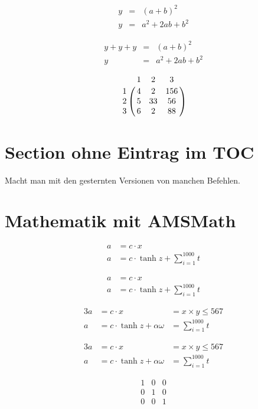 \documentclass[parskip=half]{scrartcl}
\begin{document}
\begin{eqnarray*} %
y &=& (a + b)^2 \\
y &=& a^2 + 2ab +b^2 
\end{eqnarray*}

\blindtext

\[
\begin{array}{lcr}
y + y + y &=& (a + b)^2 \\
y &=& a^2 + 2ab +b^2 
\end{array}
\]

\[ %
\bordermatrix{
   & 1 & 2 & 3 \cr
1 & 4 & 2 & 156 \cr
2 & 5 & 33 & 56 \cr
3 & 6 & 2 & 88 \cr
}
\]

\section*{Section ohne Eintrag im TOC}

Macht man mit den gesternten Versionen von manchen Befehlen.

\section{Mathematik mit AMSMath}

\begin{align} %
a &= c \cdot x \\
a &= c \cdot \tanh z + \sum_{i=1}^{1000} t
\end{align}

\begin{align*} %
a &= c \cdot x \\
a &= c \cdot \tanh z + \sum_{i=1}^{1000} t
\end{align*}

\begin{alignat}{3}
a &= c \cdot x &= x\times y \leq 567 \\
a &= c \cdot \tanh z + \alpha\omega &= \sum_{i=1}^{1000} t
\end{alignat}

\begin{alignat*}{3}
a &= c \cdot x &= x\times y \leq 567 \\
a &= c \cdot \tanh z + \alpha\omega &= \sum_{i=1}^{1000} t
\end{alignat*}

\[%
\begin{matrix} 
1 & 0 & 0 \\ 
0 & 1 & 0 \\ 
0 & 0 & 1 \\ 
\end{matrix}
\]
\end{document}
